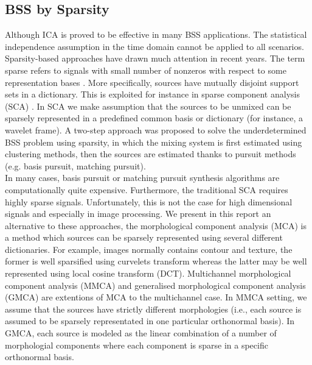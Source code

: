 \subsection{BSS by Sparsity}
Although ICA is proved to be effective in many BSS applications. The statistical independence assumption in the time domain cannot be applied to all scenarios. Sparsity-based approaches have drawn much attention in recent years. The term sparse refers to signals with small number of nonzeros with respect to some representation bases \cite{ZibulevskyMichael2001BSSb}. More specifically, sources have mutually disjoint support sets in a dictionary. This is exploited for instance in sparse component analysis (SCA) \cite{SCA2005}. In SCA we make assumption that the sources to be unmixed can be sparsely represented in a predefined common basis or dictionary (for instance, a wavelet frame). A two-step approach \cite{BOFILL20012353} was proposed to solve the underdetermined BSS problem using sparsity, in which the mixing system is first estimated using clustering methods, then the sources are estimated thanks to pursuit methods (e.g. basis pursuit, matching pursuit).\\

In many cases, basis pursuit or matching pursuit synthesis algorithms are computationally quite expensive. Furthermore, the traditional SCA requires highly sparse signals. Unfortunately, this is not the case for high dimensional signals and especially in image processing. We present in this report an alternative to these approaches, the morphological component analysis (MCA) \cite{BobinJ_2007SaMD, BobinJ_2006Mdas} is a method which sources can be sparsely represented using several different dictionaries. For example, images normally contains contour and texture, the former is well sparsified using curvelets transform whereas the latter may be well represented using local cosine transform (DCT). 
Multichannel morphological component analysis (MMCA) \cite{Starck2005MorphologicalCA} and generalised morphological component analysis (GMCA) are extentions of MCA to the multichannel case. In MMCA setting, we assume that the sources have strictly different morphologies (i.e., each source is assumed to be sparsely representated in one particular orthonormal basis). In GMCA, each source is modeled as the linear combination of a number of morphologial components where each component is sparse in a specific orthonormal basis. 

